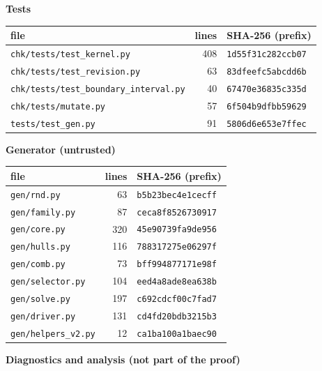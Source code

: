 \documentclass[
  11pt,
]{article}
\newcounter{none} %
\begin{document}
\textbf{Tests}

{\def\LTcaptype{none} %
\begin{longtable}[]{@{}lrl@{}}
\toprule\noalign{}
file & lines & SHA-256 (prefix) \\
\midrule\noalign{}
\endhead
\bottomrule\noalign{}
\endlastfoot
\texttt{chk/tests/test\_kernel.py} & 408 & \texttt{1d55f31c282ccb07} \\
\texttt{chk/tests/test\_revision.py} & 63 & \texttt{83dfeefc5abcdd6b} \\
\texttt{chk/tests/test\_boundary\_interval.py} & 40 &
\texttt{67470e36835c335d} \\
\texttt{chk/tests/mutate.py} & 57 & \texttt{6f504b9dfbb59629} \\
\texttt{tests/test\_gen.py} & 91 & \texttt{5806d6e653e7ffec} \\
\end{longtable}
}

\textbf{Generator (untrusted)}

{\def\LTcaptype{none} %
\begin{longtable}[]{@{}lrl@{}}
\toprule\noalign{}
file & lines & SHA-256 (prefix) \\
\midrule\noalign{}
\endhead
\bottomrule\noalign{}
\endlastfoot
\texttt{gen/rnd.py} & 63 & \texttt{b5b23bec4e1cecff} \\
\texttt{gen/family.py} & 87 & \texttt{ceca8f8526730917} \\
\texttt{gen/core.py} & 320 & \texttt{45e90739fa9de956} \\
\texttt{gen/hulls.py} & 116 & \texttt{788317275e06297f} \\
\texttt{gen/comb.py} & 73 & \texttt{bff994877171e98f} \\
\texttt{gen/selector.py} & 104 & \texttt{eed4a8ade8ea638b} \\
\texttt{gen/solve.py} & 197 & \texttt{c692cdcf00c7fad7} \\
\texttt{gen/driver.py} & 131 & \texttt{cd4fd20bdb3215b3} \\
\texttt{gen/helpers\_v2.py} & 12 & \texttt{ca1ba100a1baec90} \\
\end{longtable}
}

\textbf{Diagnostics and analysis (not part of the proof)}
\end{document}
